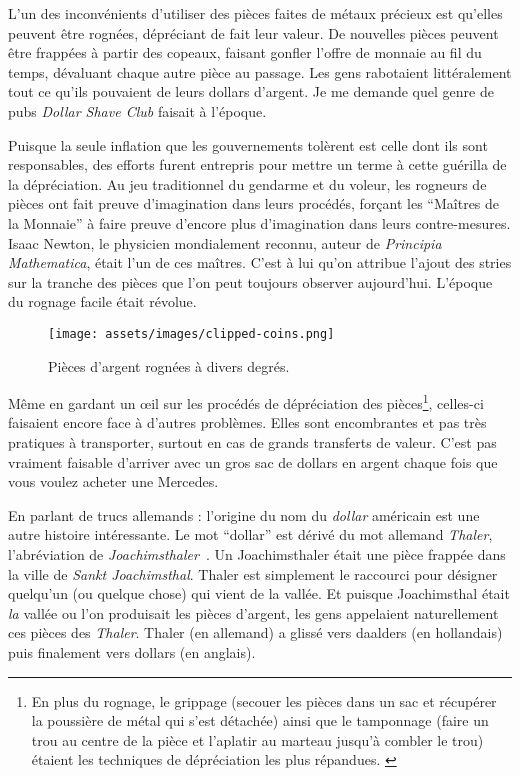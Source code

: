 L'un des inconvénients d'utiliser des pièces faites de métaux précieux est
qu'elles peuvent être rognées, dépréciant de fait leur valeur. De nouvelles
pièces peuvent être frappées à partir des copeaux, faisant gonfler l'offre de
monnaie au fil du temps, dévaluant chaque autre pièce au passage. Les gens
rabotaient littéralement tout ce qu'ils pouvaient de leurs dollars d'argent. Je
me demande quel genre de pubs \textit{Dollar Shave Club} faisait à l'époque.

Puisque la seule inflation que les gouvernements tolèrent est celle dont ils
sont responsables, des efforts furent entrepris pour mettre un terme à cette
guérilla de la dépréciation. Au jeu traditionnel du gendarme et du voleur, les
rogneurs de pièces ont fait preuve d'imagination dans leurs procédés, forçant
les \enquote{Maîtres de la Monnaie} à faire preuve d'encore plus d'imagination
dans leurs contre-mesures. Isaac Newton, le physicien mondialement reconnu,
auteur de \textit{Principia Mathematica}, était l'un de ces maîtres. C'est à lui
qu'on attribue l'ajout des stries sur la tranche des pièces que l'on peut
toujours observer aujourd'hui. L'époque du rognage facile était révolue.

\begin{figure}
  \texttt{[image: assets/images/clipped-coins.png]}
  \caption{Pièces d'argent rognées à divers degrés.}
  \label{fig:clipped-coins}
\end{figure}

Même en gardant un œil sur les procédés de dépréciation des pièces\footnote{En
plus du rognage, le grippage (secouer les pièces dans un sac et récupérer la
poussière de métal qui s'est détachée) ainsi que le tamponnage (faire un trou au
centre de la pièce et l'aplatir au marteau jusqu'à combler le trou) étaient les
techniques de dépréciation les plus répandues. \cite{wiki:coin-debasement}},
celles-ci faisaient encore face à d'autres problèmes. Elles sont encombrantes et
pas très pratiques à transporter, surtout en cas de grands transferts de valeur.
C'est pas vraiment faisable d'arriver avec un gros sac de dollars en argent
chaque fois que vous voulez acheter une Mercedes.

En parlant de trucs allemands : l'origine du nom du \textit{dollar} américain
est une autre histoire intéressante. Le mot \enquote{dollar} est dérivé du mot
allemand \textit{Thaler}, l'abréviation de
\textit{Joachimsthaler}~\cite{wiki:thaler}. Un Joachimsthaler était une pièce
frappée dans la ville de \textit{Sankt Joachimsthal}. Thaler est simplement le
raccourci pour désigner quelqu'un (ou quelque chose) qui vient de la vallée. Et
puisque Joachimsthal était \textit{la} vallée ou l'on produisait les pièces
d'argent, les gens appelaient naturellement ces pièces des \textit{Thaler}.
Thaler (en allemand) a glissé vers daalders (en hollandais) puis finalement vers
dollars (en anglais).

